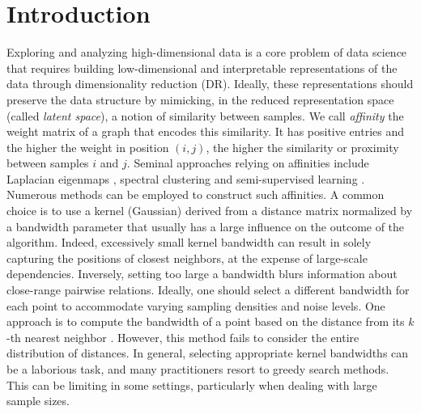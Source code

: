 
\section{Introduction}

Exploring and analyzing high-dimensional data is a core problem of data science that requires building low-dimensional and interpretable
representations of the data through dimensionality reduction (DR). Ideally, these representations should preserve the data structure by mimicking, in the reduced representation space (called \emph{latent space}), a notion of similarity between samples. 
We call \emph{affinity} the weight matrix of a graph that encodes this similarity. It has positive entries and the higher the weight in position $(i,j)$, the
higher the similarity or proximity between samples $i$ and $j$.
Seminal approaches relying on affinities include Laplacian
eigenmaps \cite{belkin2003laplacian}, spectral clustering
\cite{von2007tutorial} and semi-supervised learning \cite{zhou2003learning}. Numerous methods can be employed to construct such affinities. A common choice is to use a kernel (\eg Gaussian) derived from a distance matrix normalized by a bandwidth parameter that usually has a large influence on the outcome of the algorithm. 
Indeed, excessively small kernel bandwidth can result in %
solely capturing the positions of closest neighbors, at the expense of large-scale dependencies. Inversely, setting too large a bandwidth blurs information about close-range pairwise relations. Ideally, one should select a different bandwidth for each point to accommodate varying sampling densities and noise levels. One approach is to compute the bandwidth of a point based on the distance from its $k$-th nearest neighbor \cite{zelnik2004self}. However, this method fails to consider the entire distribution of distances.
In general, selecting appropriate kernel bandwidths can be a laborious task, and many practitioners resort to greedy search methods. This can be limiting in some settings, particularly when dealing with large sample sizes.

